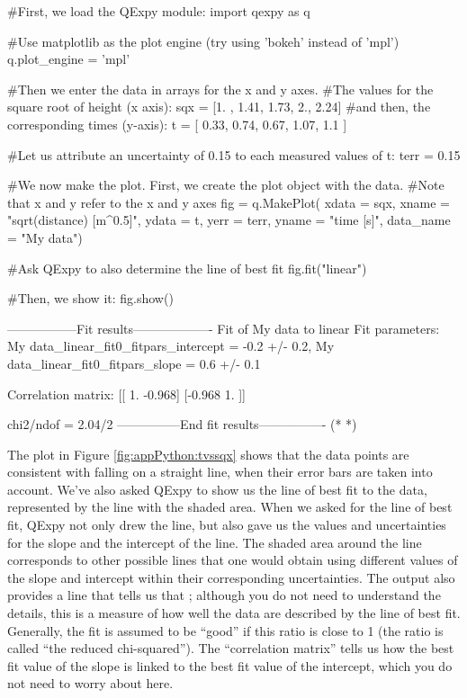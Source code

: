 \begin{python}[caption=Using QExPy to plot and fit linear data]
#First, we load the QExpy module:
import qexpy as q

#Use matplotlib as the plot engine (try using 'bokeh' instead of 'mpl')
q.plot_engine = 'mpl'

#Then we enter the data in arrays for the x and y axes.
#The values for the square root of height (x axis):
sqx = [1. , 1.41, 1.73, 2., 2.24]
#and then, the corresponding times (y-axis):
t = [ 0.33,  0.74,  0.67,  1.07,  1.1 ]

#Let us attribute an uncertainty of 0.15 to each measured values of t:
terr = 0.15

#We now make the plot. First, we create the plot object with the data.
#Note that x and y refer to the x and y axes
fig = q.MakePlot( xdata = sqx, xname = "sqrt(distance) [m^0.5]",
                  ydata = t, yerr = terr, yname = "time [s]",
                  data_name = "My data")
                  
#Ask QExpy to also determine the line of best fit                  
fig.fit("linear")
                  
#Then, we show it:
fig.show()          
\end{python}
\begin{poutput}
-----------------Fit results-------------------
Fit of  My data  to  linear
Fit parameters:
My data_linear_fit0_fitpars_intercept = -0.2 +/- 0.2,
My data_linear_fit0_fitpars_slope = 0.6 +/- 0.1

Correlation matrix: 
[[ 1.    -0.968]
 [-0.968  1.   ]]

chi2/ndof = 2.04/2
---------------End fit results----------------
(*  *)
\end{poutput}
The plot in Figure \ref{fig:appPython:tvssqx} shows that the data points are consistent with falling on a straight line, when their error bars are taken into account. We've also asked QExpy to show us the line of best fit to the data, represented by the line with the shaded area. When we asked for the line of best fit, QExpy not only drew the line, but also gave us the values and uncertainties for the slope and the intercept of the line. The shaded area around the line corresponds to other possible lines that one would obtain using different values of the slope and intercept within their corresponding uncertainties. The output also provides a line that tells us that ; although you do not need to understand the details, this is a measure of how well the data are described by the line of best fit. Generally, the fit is assumed to be ``good'' if this ratio is close to 1 (the ratio is called ``the reduced chi-squared'').  The ``correlation matrix'' tells us how the best fit value of the slope is linked to the best fit value of the intercept, which you do not need to worry about here.


